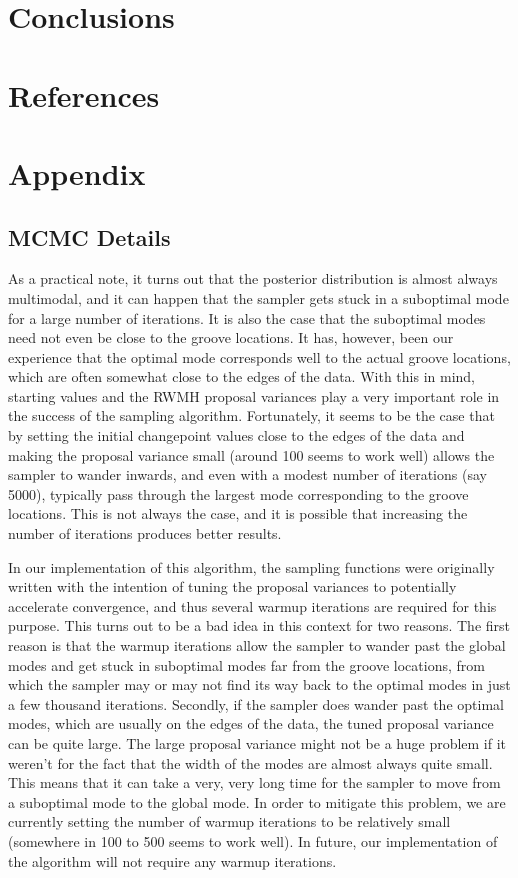 \documentclass[12pt]{article}
\begin{document}
\section{Conclusions}

\section{References}

\section{Appendix}

\subsection{MCMC Details}

As a practical note, it turns out that the posterior distribution is
almost always multimodal, and it can happen that the sampler gets stuck
in a suboptimal mode for a large number of iterations. It is also the
case that the suboptimal modes need not even be close to the groove
locations. It has, however, been our experience that the optimal mode
corresponds well to the actual groove locations, which are often
somewhat close to the edges of the data. With this in mind, starting
values and the RWMH proposal variances play a very important role in the
success of the sampling algorithm. Fortunately, it seems to be the case
that by setting the initial changepoint values close to the edges of the
data and making the proposal variance small (around 100 seems to work
well) allows the sampler to wander inwards, and even with a modest
number of iterations (say 5000), typically pass through the largest mode
corresponding to the groove locations. This is not always the case, and
it is possible that increasing the number of iterations produces better
results.

In our implementation of this algorithm, the sampling functions were
originally written with the intention of tuning the proposal variances
to potentially accelerate convergence, and thus several warmup
iterations are required for this purpose. This turns out to be a bad
idea in this context for two reasons. The first reason is that the
warmup iterations allow the sampler to wander past the global modes and
get stuck in suboptimal modes far from the groove locations, from which
the sampler may or may not find its way back to the optimal modes in
just a few thousand iterations. Secondly, if the sampler does wander
past the optimal modes, which are usually on the edges of the data, the
tuned proposal variance can be quite large. The large proposal variance
might not be a huge problem if it weren't for the fact that the width of
the modes are almost always quite small. This means that it can take a
very, very long time for the sampler to move from a suboptimal mode to
the global mode. In order to mitigate this problem, we are currently
setting the number of warmup iterations to be relatively small
(somewhere in 100 to 500 seems to work well). In future, our
implementation of the algorithm will not require any warmup iterations.
\end{document}
